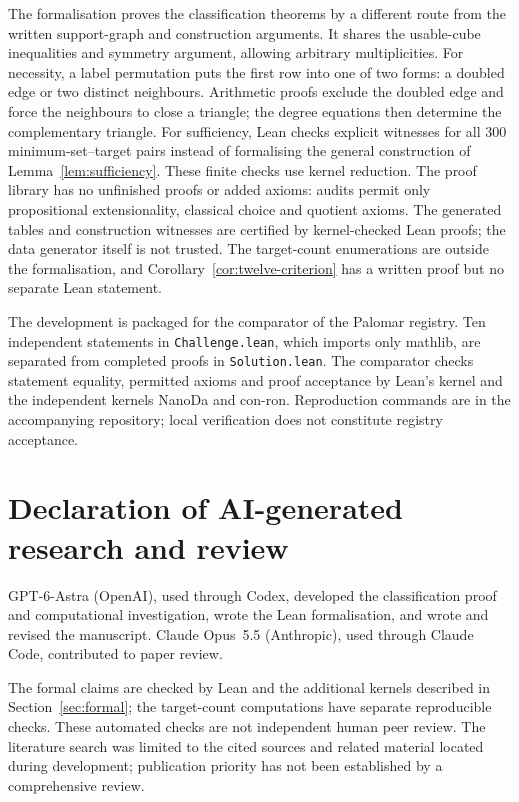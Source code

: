 \documentclass[11pt]{article}
\begin{document}
The formalisation proves the classification theorems by a different route
from the written support-graph and construction arguments. It shares the
usable-cube inequalities and symmetry argument, allowing arbitrary
multiplicities. For necessity, a label permutation puts the first row into one of
two forms: a doubled edge or two distinct neighbours. Arithmetic proofs
exclude the doubled edge and force the neighbours to close a triangle;
the degree equations then determine the complementary triangle. For
sufficiency, Lean checks explicit witnesses for all 300 minimum-set--target
pairs instead of formalising the general construction of
Lemma~\ref{lem:sufficiency}. These finite checks use kernel reduction. The proof library has no unfinished
proofs or added axioms: audits permit only propositional extensionality,
classical choice and quotient axioms. The generated tables and construction
witnesses are certified by kernel-checked Lean proofs; the data generator
itself is not trusted. The target-count enumerations
are outside the formalisation, and Corollary~\ref{cor:twelve-criterion}
has a written proof but no separate Lean statement.

The development is packaged for the comparator of the Palomar registry.
Ten independent statements in
\texttt{Challenge.lean}, which imports only mathlib, are separated from
completed proofs in \texttt{Solution.lean}. The comparator checks statement
equality, permitted axioms and proof acceptance by Lean's kernel and the
independent kernels NanoDa and con-ron. Reproduction commands are in the
accompanying repository; local verification does not constitute registry
acceptance.

\section*{Declaration of AI-generated research and review}
GPT-6-Astra (OpenAI),
used through Codex, developed the classification proof and computational
investigation, wrote the Lean formalisation, and wrote and revised the
manuscript. Claude Opus~5.5 (Anthropic), used through Claude Code, contributed to
paper review.

The formal claims are checked by Lean and the additional kernels described
in Section~\ref{sec:formal}; the target-count computations have separate
reproducible checks. These automated checks are not independent human peer
review. The literature search was limited to the cited sources and related
material located during development; publication priority has not been
established by a comprehensive review.
\end{document}
